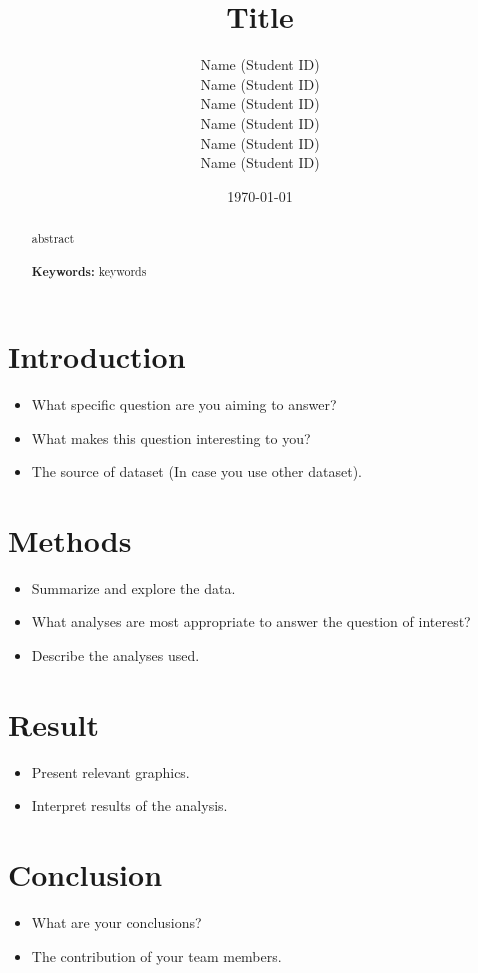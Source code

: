 \documentclass[11pt]{article}
\title{\Huge Title}
\author{
    \parbox{0.3\textwidth}{
        \centering Name (Student ID)
    }
    \parbox{0.3\textwidth}{
        \centering Name (Student ID)
    }
    \parbox{0.3\textwidth}{
        \centering Name (Student ID)
    }
    \parbox{0.3\textwidth}{
        \centering Name (Student ID)
    }
    \parbox{0.3\textwidth}{
        \centering Name (Student ID)
    }
    \parbox{0.3\textwidth}{
        \centering Name (Student ID)
    }
}
\date{\today}
\renewcommand\thesection{\arabic{section}}
\begin{document}
\maketitle

\begin{abstract}
    abstract
    \\\\
    \textbf{Keywords:} keywords
\end{abstract}

\newpage

\tableofcontents
\thispagestyle{empty}
\setcounter{page}{0}

\newpage

\section{Introduction}

\begin{itemize}
    \item What specific question are you aiming to answer?
    \item What makes this question interesting to you?
    \item The source of dataset (In case you use other dataset).
\end{itemize}

\section{Methods}

\begin{itemize}
    \item Summarize and explore the data.
    \item What analyses are most appropriate to answer the question of interest?
    \item Describe the analyses used.
\end{itemize}

\section{Result}

\begin{itemize}
    \item Present relevant graphics.
    \item Interpret results of the analysis.
\end{itemize}

\section{Conclusion}

\begin{itemize}
    \item What are your conclusions?
    \item The contribution of your team members.
\end{itemize}

\newpage





\end{document}
